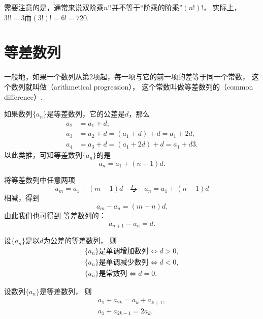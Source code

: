 需要注意的是，通常来说双阶乘\(n!!\)并不等于“阶乘的阶乘”\((n!)!\)，
实际上，\(3!! = 3\)而\((3!)! = 6! = 720\).

\section{等差数列}
一般地，如果一个数列从第2项起，每一项与它的前一项的差等于同一个常数，
这个数列就叫做（arithmetical progression），
这个常数叫做等差数列的（common difference）.

如果数列\(\{a_n\}\)是等差数列，它的公差是\(d\)，那么\begin{align*}
    a_2 &= a_1 + d, \\
    a_3 &= a_2 + d = (a_1 + d) + d = a_1 + 2d, \\
    a_4 &= a_3 + d = (a_1 + 2d) + d = a_1 + d3.
\end{align*}
以此类推，可知等差数列\(\{a_n\}\)的是\begin{equation}
    a_n = a_1 + (n-1) d.
\end{equation}

将等差数列中任意两项\begin{equation*}
    a_m = a_1 + (m-1) d
    \quad\text{与}\quad
    a_n = a_1 + (n-1) d
\end{equation*}相减，得到\begin{equation*}
    a_m - a_n = (m-n) d.
\end{equation*}
由此我们也可得到%
等差数列的：\begin{equation}
    a_{n+1} - a_n = d.
\end{equation}

\begin{theorem}
设\(\{a_n\}\)是以\(d\)为公差的等差数列，
则\begin{gather*}
	\text{$\{a_n\}$是单调增加数列}
	\iff
	d > 0, \\
	\text{$\{a_n\}$是单调减少数列}
	\iff
	d < 0, \\
	\text{$\{a_n\}$是常数列}
	\iff
	d = 0.
\end{gather*}
\end{theorem}

\begin{property}
设数列\(\{a_n\}\)是等差数列，
则\begin{gather}
	a_1 + a_{2k} = a_k + a_{k+1}, \\
	a_1 + a_{2k-1} = 2 a_k.
\end{gather}
\end{property}

